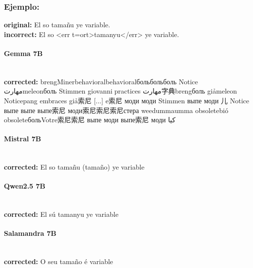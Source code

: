 \subsubsection{Ejemplo:}
\textbf{original:} El so tamañu ye variable.\\
\textbf{incorrect:} El so {\textless}err t=ort{\textgreater}tamanyu{\textless}/err{\textgreater} ye variable.

\paragraph{Gemma 7B}~\\
\textbf{corrected:} brengMinerbehavioralbehavioralбольбольболь Notice مهارتmeleonболь Stimmen giovanni🥈practices مهارت字典brengболь giảmeleon Noticepang embraces giả索尼  [...] e索尼 моди моди Stimmen выпе моди 儿 Notice выпе выпе выпе索尼 моди索尼索尼索尼стера weedummaumma obsoletebió obsoleteбольVotre索尼索尼 выпе моди выпе索尼 моди کیا

\paragraph{Mistral 7B}~\\
\textbf{corrected:} El so tamañu (tamaño) ye variable

\paragraph{Qwen2.5 7B}~\\
\textbf{corrected:} El sú tamanyu ye variable

\paragraph{Salamandra 7B}~\\
\textbf{corrected:} O seu tamaño é variable